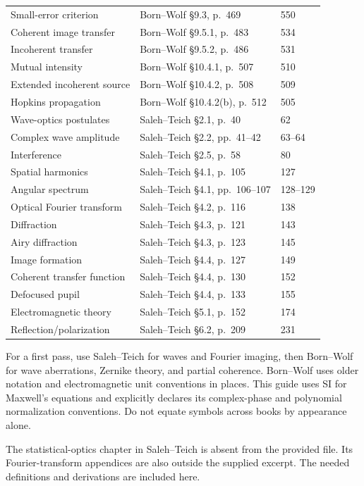 \begin{longtable}{@{}L{.27\textwidth}L{.44\textwidth}L{.20\textwidth}@{}}
Small-error criterion & Born--Wolf \S9.3, p.~469 &550\\
Coherent image transfer & Born--Wolf \S9.5.1, p.~483 &534\\
Incoherent transfer & Born--Wolf \S9.5.2, p.~486 &531\\
Mutual intensity & Born--Wolf \S10.4.1, p.~507 &510\\
Extended incoherent source & Born--Wolf \S10.4.2, p.~508 &509\\
Hopkins propagation & Born--Wolf \S10.4.2(b), p.~512 &505\\
\midrule
Wave-optics postulates & Saleh--Teich \S2.1, p.~40 &62\\
Complex wave amplitude & Saleh--Teich \S2.2, pp.~41--42 &63--64\\
Interference & Saleh--Teich \S2.5, p.~58 &80\\
Spatial harmonics & Saleh--Teich \S4.1, p.~105 &127\\
Angular spectrum & Saleh--Teich \S4.1, pp.~106--107 &128--129\\
Optical Fourier transform & Saleh--Teich \S4.2, p.~116 &138\\
Diffraction & Saleh--Teich \S4.3, p.~121 &143\\
Airy diffraction & Saleh--Teich \S4.3, p.~123 &145\\
Image formation & Saleh--Teich \S4.4, p.~127 &149\\
Coherent transfer function & Saleh--Teich \S4.4, p.~130 &152\\
Defocused pupil & Saleh--Teich \S4.4, p.~133 &155\\
Electromagnetic theory & Saleh--Teich \S5.1, p.~152 &174\\
Reflection/polarization & Saleh--Teich \S6.2, p.~209 &231\\
\bottomrule
\end{longtable}

For a first pass, use Saleh--Teich for waves and Fourier imaging, then
Born--Wolf for wave aberrations, Zernike theory, and partial coherence.
Born--Wolf uses older notation and electromagnetic unit conventions in
places. This guide uses SI for Maxwell's equations and explicitly
declares its complex-phase and polynomial normalization conventions.
Do not equate symbols across books by appearance alone.

The statistical-optics chapter in Saleh--Teich is absent from the
provided file. Its Fourier-transform appendices are also outside the
supplied excerpt. The needed definitions and derivations are included here.

